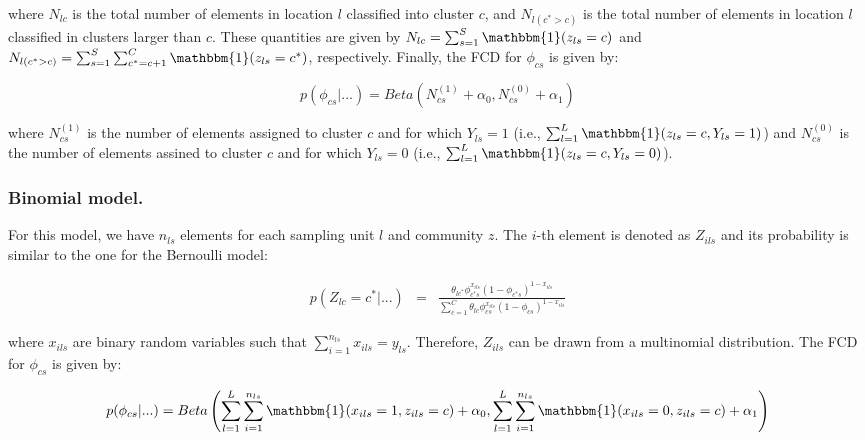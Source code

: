 \documentclass[article]{jss}
\begin{document}
\noindent where \(N_{lc}\) is the total number of elements in location
\(l\) classified into cluster \(c\), and \(N_{l(c^{*}>c)}\) is the total
number of elements in location \(l\) classified in clusters larger than
\(c\). These quantities are given by
\(N_{lc}=\sum_{s=1}^{S}\mathbbm{1}(z_{ls}=c)\) and
\(N_{l(c^{*}>c)}=\sum_{s=1}^{S}\sum_{c^{*}=c+1}^{C}\mathbbm{1}(z_{ls}=c^{*})\),
respectively. Finally, the FCD for \(\phi_{cs}\) is given by:

\[
p(\phi_{cs}|...)=Beta(N_{cs}^{(1)}+\alpha_0,N_{cs}^{(0)}+\alpha_1)
\]

\noindent where \(N_{cs}^{(1)}\) is the number of elements assigned to
cluster \(c\) and for which \(Y_{ls}=1\) (i.e.,
\(\sum_{l=1}^L\mathbbm{1}(z_{ls}=c,Y_{ls}=1)\)) and \(N_{cs}^{(0)}\) is
the number of elements assined to cluster \(c\) and for which
\(Y_{ls}=0\) (i.e., \(\sum_{l=1}^L\mathbbm{1}(z_{ls}=c,Y_{ls}=0)\)).

\subsubsection{Binomial model.}\label{binomial-model.}

For this model, we have \(n_{ls}\) elements for each sampling unit \(l\)
and community \(z\). The \(i\)-th element is denoted as \(Z_{ils}\) and
its probability is similar to the one for the Bernoulli model:

\begin{equation}
\begin{array}{lll}
p(Z_{lc}=c^{*}|...)&=&\frac{\theta_{lc^{*}}\phi_{c^{*}s}^{x_{ils}}(1-\phi_{c^{*}s})^{1-x_{ils}}}{\displaystyle\sum_{c=1}^{C}\theta_{lc}\phi_{cs}^{x_{ils}}(1-\phi_{cs})^{1-x_{ils}}}
\end{array}
\label{eq:eq0006} 
\end{equation}

\noindent where \(x_{ils}\) are binary random variables such that
\(\sum_{i=1}^{n_{ls}}x_{ils}=y_{ls}\). Therefore, \(Z_{ils}\) can be
drawn from a multinomial distribution. The FCD for \(\phi_{cs}\) is
given by:

\begin{equation}
\begin{array}{lll}
p(\phi_{cs}|...)= Beta\left(\displaystyle\sum_{l=1}^{L}\displaystyle\sum_{i=1}^{n_{ls}}\mathbbm{1}(x_{ils}=1,z_{ils}=c)+\alpha_{0},\displaystyle\sum_{l=1}^{L}\displaystyle\sum_{i=1}^{n_{ls}}\mathbbm{1}(x_{ils}=0,z_{ils}=c)+\alpha_{1}\right)
\end{array}
\label{eq:eq0007} 
\end{equation}
\end{document}
